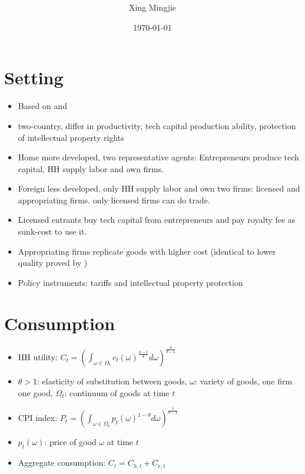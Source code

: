 \documentclass[10pt]{article} %
\title{\cite{MandelmanWaddle2020}}
\author{Xing Mingjie}
\date{\today} %
\begin{document}
\maketitle


\section{Setting}
\begin{itemize}
    \item Based on \cite{GhironiMelits2005} and \cite{HolmesMcGrattanPrescott2015}
    \item two-country, differ in productivity, tech capital production ability, protection of intellectual property rights
    \item Home more developed, two representative agents: Entrepreneurs produce tech capital, HH supply labor and own firms.
    \item Foreign less developed, only HH supply labor and own two firms: licensed and appropriating firms. only licensed firms can do trade.
    \item Licensed entrants buy tech capital from entrepreneurs and pay royalty fee as sunk-cost to use it.
    \item Appropriating firms replicate goods with higher cost (identical to lower quality proved by \cite{HolmesMcGrattanPrescott2015})
    \item Policy instruments: tariffs and intellectual property protection
\end{itemize}

\section{Consumption}
    \begin{itemize}
        \item HH utility: $C_t = (\int_{\omega\in\Omega_t}c_t(\omega)^\frac{\theta-1}{\theta}d\omega)^\frac{\theta}{\theta-1}$
        \item $\theta>1$: elasticity of substitution between goods, $\omega$: variety of goods, one firm one good, $\Omega_t$: continuum of goods at time $t$
        \item CPI index: $P_t = (\int_{\omega\in\Omega_t}p_t(\omega)^{1-\theta}d\omega)^\frac{1}{\theta-1}$
        \item $p_t(\omega)$: price of good $\omega$ at time $t$
        \item Aggregate consumption: $C_t = C_{h,t} + C_{e,t}$
    \end{itemize}
\end{document}

